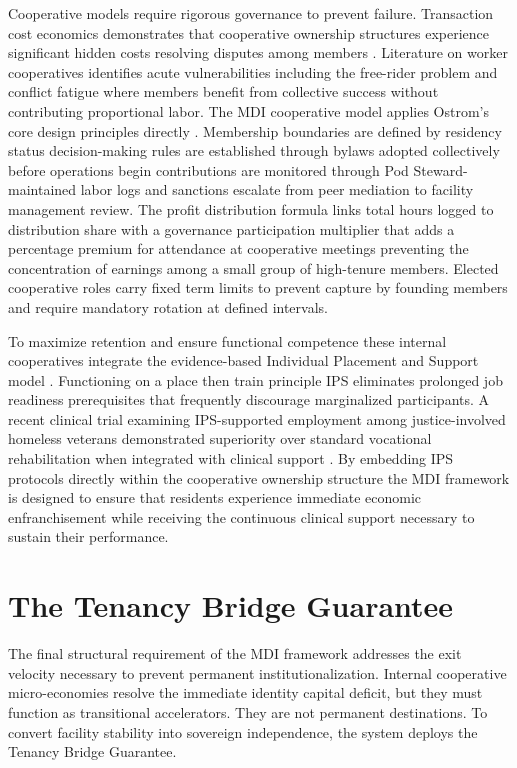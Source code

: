 \documentclass[12pt, letterpaper]{article}
\begin{document}
Cooperative models require rigorous governance to prevent failure. Transaction cost economics demonstrates that cooperative ownership structures experience significant hidden costs resolving disputes among members \citep{hansmann1996ownership}. Literature on worker cooperatives identifies acute vulnerabilities including the free-rider problem \citep{olson1965logic} and conflict fatigue where members benefit from collective success without contributing proportional labor. The MDI cooperative model applies Ostrom's core design principles directly \citep{ostrom1990governing}. Membership boundaries are defined by residency status decision-making rules are established through bylaws adopted collectively before operations begin contributions are monitored through Pod Steward-maintained labor logs and sanctions escalate from peer mediation to facility management review. The profit distribution formula links total hours logged to distribution share with a governance participation multiplier that adds a percentage premium for attendance at cooperative meetings preventing the concentration of earnings among a small group of high-tenure members. Elected cooperative roles carry fixed term limits to prevent capture by founding members and require mandatory rotation at defined intervals.

To maximize retention and ensure functional competence these internal cooperatives integrate the evidence-based Individual Placement and Support model \citep{drake2012individual}. Functioning on a place then train principle IPS eliminates prolonged job readiness prerequisites that frequently discourage marginalized participants. A recent clinical trial examining IPS-supported employment among justice-involved homeless veterans demonstrated superiority over standard vocational rehabilitation when integrated with clinical support \citep{lepage2021individualized}. By embedding IPS protocols directly within the cooperative ownership structure the MDI framework is designed to ensure that residents experience immediate economic enfranchisement while receiving the continuous clinical support necessary to sustain their performance.

\section{The Tenancy Bridge Guarantee}\label{sec:tbg}

The final structural requirement of the MDI framework addresses the exit velocity necessary to prevent permanent institutionalization. Internal cooperative micro-economies resolve the immediate identity capital deficit, but they must function as transitional accelerators. They are not permanent destinations. To convert facility stability into sovereign independence, the system deploys the Tenancy Bridge Guarantee.
\end{document}
